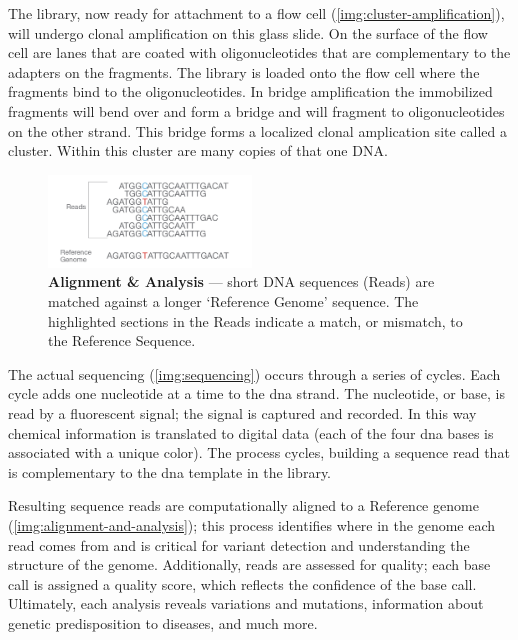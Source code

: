 The library, now ready for attachment to a flow cell (\autoref{img:cluster-amplification}), will undergo clonal amplification on this glass slide. On the surface of the flow cell are lanes that are coated with oligonucleotides that are complementary to the adapters on the fragments. The library is loaded onto the flow cell where the fragments bind to the oligonucleotides. In bridge amplification the immobilized fragments will bend over and form a bridge and will fragment to oligonucleotides on the other strand. This bridge forms a localized clonal amplication site called a cluster. Within this cluster are many copies of that one DNA.


\begin{figure}
  \centering
  \includegraphics[width=0.48\textwidth]{resources/images/Alignment and Data Analysis.png}
  \caption{\textbf{Alignment \& Analysis} \cite{Illumina2017-ADA} — short DNA sequences (Reads) are matched against a longer ‘Reference Genome’ sequence. The highlighted sections in the Reads indicate a match, or mismatch, to the Reference Sequence.}
  \label{img:alignment-and-analysis}
\end{figure}

The actual \gls{sequencing} (\autoref{img:sequencing}) occurs through a series of cycles. Each cycle adds one nucleotide at a time to the \gls{dna} strand. The nucleotide, or base, is read by a fluorescent signal; the signal is captured and recorded. In this way chemical information is translated to digital data (each of the four \gls{dna} bases is associated with a unique color). The process cycles, building a sequence read that is complementary to the \gls{dna} template in the library.

Resulting sequence reads are computationally aligned to a Reference \gls{genome} (\autoref{img:alignment-and-analysis}); this process identifies where in the \gls{genome} each \gls{read} comes from and is critical for variant detection and understanding the structure of the \gls{genome}. Additionally, \gls{read}s are assessed for quality; each base call is assigned a quality score, which reflects the confidence of the base call. Ultimately, each analysis reveals variations and mutations, information about genetic predisposition to diseases, and much more.

